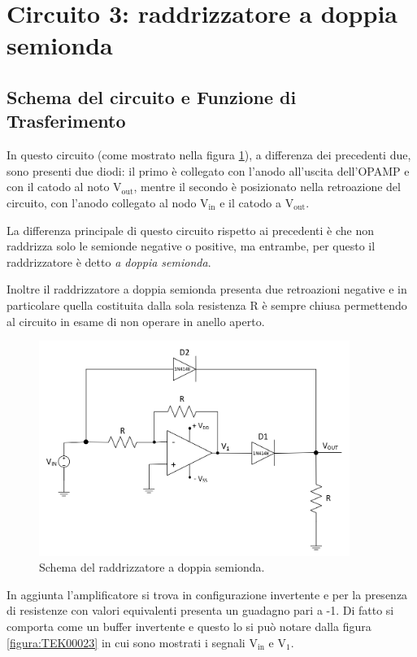 \documentclass{report}
\begin{document}
\section{Circuito 3: raddrizzatore a doppia semionda}
\subsection{Schema del circuito e Funzione di Trasferimento}
In questo circuito (come mostrato nella figura \ref{figura:schema3}), a differenza dei precedenti due, sono presenti due diodi: il primo è collegato con l'anodo all'uscita dell'OPAMP e con il catodo al noto $\displaystyle\mathrm{V_{out}}$, mentre il secondo è posizionato nella retroazione del circuito, con l'anodo collegato al nodo $\displaystyle\mathrm{V_{in}}$ e il catodo a $\displaystyle\mathrm{V_{out}}$.\par
La differenza principale di questo circuito rispetto ai precedenti è che non raddrizza solo le semionde negative o positive, ma entrambe, per questo il raddrizzatore è detto \textit{a doppia semionda}. \par
Inoltre il raddrizzatore a doppia semionda presenta due retroazioni negative e in particolare quella costituita dalla sola resistenza R è sempre chiusa permettendo al circuito in esame di non operare in anello aperto.\par
\begin{figure}[h]
	\centering
	\includegraphics[height=7cm]{immagini/schema3}
	\caption{Schema del raddrizzatore a doppia semionda.}
	\label{figura:schema3}
\end{figure}
In aggiunta l'amplificatore si trova in configurazione invertente e per la presenza di resistenze con valori equivalenti presenta un guadagno pari a -1. Di fatto si comporta come un buffer invertente e questo lo si può notare dalla figura \ref{figura:TEK00023} in cui sono mostrati i segnali $\displaystyle\mathrm{V_{in}}$ e $\displaystyle\mathrm{V_{1}}$.
\end{document}
